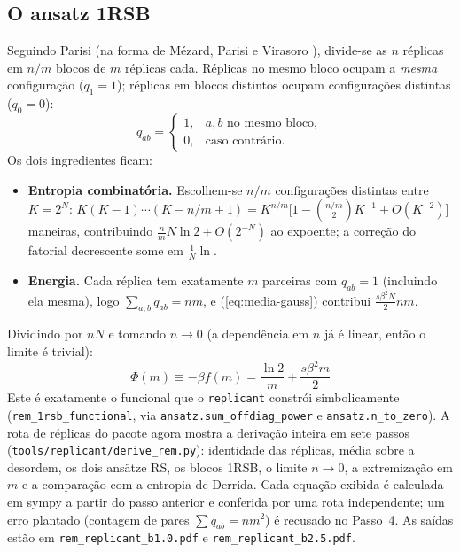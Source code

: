 \documentclass[11pt,a4paper]{article}
\begin{document}
\subsection{O ansatz 1RSB}
Seguindo Parisi (na forma de Mézard, Parisi e Virasoro \cite{mpv}), divide-se as $n$ réplicas em
$n/m$ blocos de $m$ réplicas cada. Réplicas no mesmo bloco ocupam a \emph{mesma} configuração
($q_1=1$); réplicas em blocos distintos ocupam configurações distintas ($q_0=0$):
\begin{equation}
  q_{ab}=\begin{cases}1,& a,b\text{ no mesmo bloco},\\0,&\text{caso contrário}.\end{cases}
\end{equation}
Os dois ingredientes ficam:
\begin{itemize}
\item \textbf{Entropia combinatória.} Escolhem-se $n/m$ configurações distintas entre $K=2^N$:
$K(K-1)\cdots(K-n/m+1)=K^{n/m}\big[1-\binom{n/m}{2}K^{-1}+O(K^{-2})\big]$ maneiras, contribuindo
$\frac{n}{m}N\ln2+O(2^{-N})$ ao expoente; a correção do fatorial decrescente some em $\frac1N\ln$.
\item \textbf{Energia.} Cada réplica tem exatamente $m$ parceiras com $q_{ab}=1$ (incluindo ela mesma),
logo $\sum_{a,b}q_{ab}=nm$, e (\ref{eq:media-gauss}) contribui $\frac{s\beta^2N}{2}nm$.
\end{itemize}
Dividindo por $nN$ e tomando $n\to0$ (a dependência em $n$ já é linear, então o limite é trivial):
\begin{equation}
  \boxed{\;\Phi(m)\equiv-\beta f(m)=\frac{\ln2}{m}+\frac{s\beta^2m}{2}\;}
  \label{eq:funcional}
\end{equation}
Este é exatamente o funcional que o \texttt{replicant} constrói simbolicamente
(\texttt{rem\_1rsb\_functional}, via \texttt{ansatz.sum\_offdiag\_power} e \texttt{ansatz.n\_to\_zero}).
A rota de réplicas do pacote agora mostra a derivação inteira em sete passos
(\texttt{tools/replicant/derive\_rem.py}): identidade das réplicas, média sobre a desordem, os dois
ansätze RS, os blocos 1RSB, o limite $n\to0$, a extremização em $m$ e a comparação com a entropia
de Derrida. Cada equação exibida é calculada em sympy a partir do passo anterior e conferida por
uma rota independente; um erro plantado (contagem de pares $\sum q_{ab}=nm^2$) é recusado no
Passo~4. As saídas estão em \texttt{rem\_replicant\_b1.0.pdf} e \texttt{rem\_replicant\_b2.5.pdf}.
\end{document}
